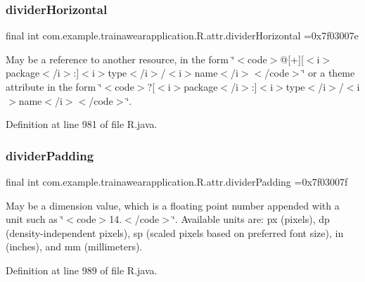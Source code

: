 \subsubsection{\texorpdfstring{dividerHorizontal}{dividerHorizontal}}
{\footnotesize\ttfamily final int com.\+example.\+trainawearapplication.\+R.\+attr.\+divider\+Horizontal =0x7f03007e\hspace{0.3cm}{\ttfamily [static]}}

May be a reference to another resource, in the form \char`\"{}$<$code$>$@\mbox{[}+\mbox{]}\mbox{[}$<$i$>$package$<$/i$>$\+:\mbox{]}$<$i$>$type$<$/i$>$/$<$i$>$name$<$/i$>$$<$/code$>$\char`\"{} or a theme attribute in the form \char`\"{}$<$code$>$?\mbox{[}$<$i$>$package$<$/i$>$\+:\mbox{]}$<$i$>$type$<$/i$>$/$<$i$>$name$<$/i$>$$<$/code$>$\char`\"{}. 

Definition at line 981 of file R.\+java.

\mbox{\label{classcom_1_1example_1_1trainawearapplication_1_1_r_1_1attr_a52670a59f374c9261f927582e4208e2e}} 
\subsubsection{\texorpdfstring{dividerPadding}{dividerPadding}}
{\footnotesize\ttfamily final int com.\+example.\+trainawearapplication.\+R.\+attr.\+divider\+Padding =0x7f03007f\hspace{0.3cm}{\ttfamily [static]}}

May be a dimension value, which is a floating point number appended with a unit such as \char`\"{}$<$code$>$14.\+5sp$<$/code$>$\char`\"{}. Available units are\+: px (pixels), dp (density-\/independent pixels), sp (scaled pixels based on preferred font size), in (inches), and mm (millimeters). 

Definition at line 989 of file R.\+java.

\mbox{\label{classcom_1_1example_1_1trainawearapplication_1_1_r_1_1attr_a3d2783cce6f0a3f5b1f6f86cc8d6a023}} 
